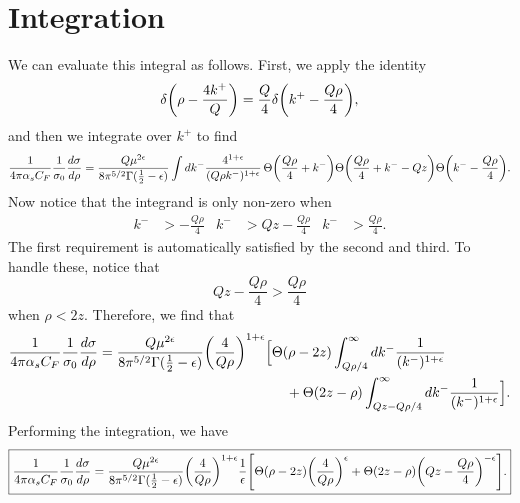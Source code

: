 \documentclass[11pt,twoside,reqno]{amsart}
\theoremstyle{plain}
\theoremstyle{remark}
\theoremstyle{definition}
\theoremstyle{remark}
\theoremstyle{definition}
\theoremstyle{definition}
\begin{document}
\section{Integration}

	We can evaluate this integral as follows. First, we apply the identity
	\begin{equation}
		\delta\qty(\rho - \frac{4 k^+}{Q}) = \frac{Q}{4}\delta\qty(k^+ - \frac{Q\rho}{4}),
	\end{equation}
	and then we integrate over $k^+$ to find
	\begin{equation}
	\begin{aligned}
		\frac{1}{4\pi \alpha_s C_F}\frac{1}{\sigma_0} \frac{d\sigma}{d\rho} = \frac{Q \mu^{2\epsilon}}{8\pi^{5/2}\Gamma(\frac{1}{2} - \epsilon)}
		\int dk^- 
		\frac{4^{1 + \epsilon}}{(Q\rho k^-)^{1 + \epsilon}} \, 
		\Theta\qty(\frac{Q\rho}{4} + k^-) 
		\Theta\qty(\frac{Q\rho}{4} + k^- - Qz)
		\Theta\qty(k^- - \frac{Q\rho}{4}).
	\end{aligned}
	\end{equation}
	Now notice that the integrand is only non-zero when
	\begin{align}
		k^- &> -\frac{Q\rho}{4} & k^- &> Qz - \frac{Q\rho}{4} & k^- &> \frac{Q\rho}{4}.
	\end{align}
	The first requirement is automatically satisfied by the second and third. To handle these, notice that
	\begin{equation}
		Qz - \frac{Q\rho}{4} > \frac{Q\rho}{4}
	\end{equation}
	when $\rho < 2z$. Therefore, we find that
	\begin{equation}
	\begin{aligned}
		\frac{1}{4\pi \alpha_s C_F}\frac{1}{\sigma_0} \frac{d\sigma}{d\rho} = 
		\frac{Q \mu^{2\epsilon}}{8\pi^{5/2}\Gamma(\frac{1}{2} - \epsilon)} \qty(\frac{4}{Q \rho})^{1 + \epsilon} \Big[ & \Theta(\rho - 2z) \int_{Q\rho/4}^\infty dk^- \frac{1}{(k^-)^{1 + \epsilon}} \\
		&\quad + \Theta(2z - \rho) \int_{Qz - Q\rho/4}^\infty dk^- \frac{1}{(k^-)^{1 + \epsilon}} \Big].
	\end{aligned}
	\end{equation}
	Performing the integration, we have
	\begin{equation}
	\boxed{
	\begin{aligned}
		\frac{1}{4\pi \alpha_s C_F}\frac{1}{\sigma_0} \frac{d\sigma}{d\rho} = 
		\frac{Q \mu^{2\epsilon}}{8\pi^{5/2}\Gamma(\frac{1}{2} - \epsilon)} \qty(\frac{4}{Q \rho})^{1 + \epsilon} \frac{1}{\epsilon} \qty[ \Theta(\rho - 2z) \qty(\frac{4}{Q\rho})^\epsilon + \Theta(2z - \rho) \qty(Qz - \frac{Q\rho}{4})^{-\epsilon} ].
	\end{aligned}
	}
	\end{equation}
\end{document}
